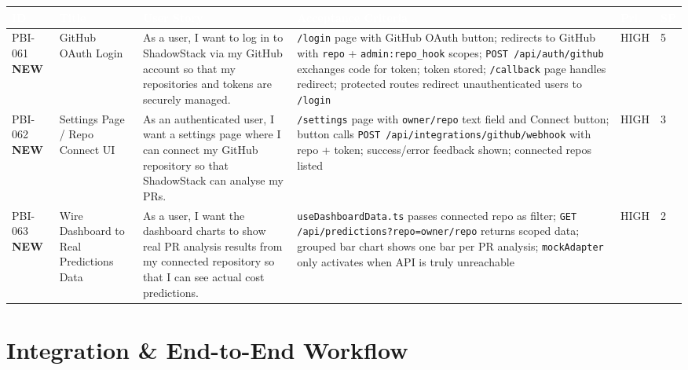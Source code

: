 \documentclass[10pt,a4paper]{article}
\newcommand{\New}{\textcolor{warning}{\textbf{NEW}}}
\begin{document}
\renewcommand{\arraystretch}{1.45}
\begin{tabularx}{\textwidth}{|L{1.5cm}|L{3cm}|X|L{3cm}|L{1cm}|L{0.6cm}|}
\hline
{}
\textcolor{white}{\textbf{ID}} &
\textcolor{white}{\textbf{Title}} &
\textcolor{white}{\textbf{User Story}} &
\textcolor{white}{\textbf{Acceptance Criteria}} &
\textcolor{white}{\textbf{Pri.}} &
\textcolor{white}{\textbf{SP}} \\ \hline

PBI-061 \New{} &
GitHub OAuth Login &
As a user, I want to log in to ShadowStack via my GitHub account so that my repositories and tokens are securely managed. &
\texttt{/login} page with GitHub OAuth button; redirects to GitHub with \texttt{repo} + \texttt{admin:repo\_hook} scopes; \texttt{POST /api/auth/github} exchanges code for token; token stored; \texttt{/callback} page handles redirect; protected routes redirect unauthenticated users to \texttt{/login} &
HIGH & 5 \\ \hline

PBI-062 \New{} &
Settings Page / Repo Connect UI &
As an authenticated user, I want a settings page where I can connect my GitHub repository so that ShadowStack can analyse my PRs. &
\texttt{/settings} page with \texttt{owner/repo} text field and Connect button; button calls \texttt{POST /api/integrations/github/webhook} with repo + token; success/error feedback shown; connected repos listed &
HIGH & 3 \\ \hline

PBI-063 \New{} &
Wire Dashboard to Real Predictions Data &
As a user, I want the dashboard charts to show real PR analysis results from my connected repository so that I can see actual cost predictions. &
\texttt{useDashboardData.ts} passes connected repo as filter; \texttt{GET /api/predictions?repo=owner/repo} returns scoped data; grouped bar chart shows one bar per PR analysis; \texttt{mockAdapter} only activates when API is truly unreachable &
HIGH & 2 \\ \hline

\end{tabularx}

\vspace{0.8em}

\section{Integration \& End-to-End Workflow}
\end{document}
